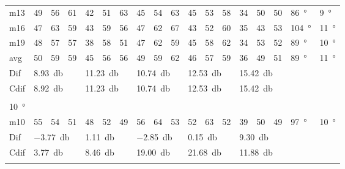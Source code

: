 \begin{table}[H]
\begin{tabular}{l|l|l|l|l|l|l|l|l|l|l|l|l|l|l|l|l|l}
m13  & 49     & 56     & 61    & 42     & 51     & 63    & 45     & 54     & 63    & 45     & 53     & 58    & 34 & 50 & 50   & \SI{86}{\degree} & \SI{9}{\degree}  \\
m16  & 47     & 63     & 59    & 43     & 59     & 56    & 47     & 62     & 67    & 43     & 52     & 60    & 35 & 43 & 53   & \SI{104}{\degree} & \SI{11}{\degree}  \\
m19  & 48     & 57     & 57    & 38     & 58     & 51    & 47     & 62     & 59    & 45     & 58     & 62    & 34 & 53 & 52   & \SI{89}{\degree} & \SI{10}{\degree}  \\ \hline
avg  &  50    &  59    & 59    &  45     &  56    &  56   & 49     & 59     & 62    & 46     & 57     & 59    & 36   & 49   & 51   & \SI{89}{\degree} & \SI{11}{\degree}  \\ \hline  
Dif & \multicolumn{3}{l|}{\SI{8.93}{\decibel}} & \multicolumn{3}{l|}{\SI{11.23}{\decibel}} & \multicolumn{3}{l|}{\SI{10.74}{\decibel}} & \multicolumn{3}{l|}{\SI{12.53}{\decibel}} & \multicolumn{3}{l|}{\SI{15.42}{\decibel}} & \multicolumn{2}{l}{}  \\ \hline 
Cdif & \multicolumn{3}{l|}{\SI{8.92}{\decibel}} & \multicolumn{3}{l|}{\SI{11.23}{\decibel}} & \multicolumn{3}{l|}{\SI{10.74}{\decibel}} & \multicolumn{3}{l|}{\SI{12.53}{\decibel}} & \multicolumn{3}{l|}{\SI{15.42}{\decibel}}  &   \multicolumn{2}{l}{}   \\ 
 \multicolumn{18}{l}{ } \\                             
\SI{10}{\degree}   & \multicolumn{3}{l|}{} & \multicolumn{3}{l|}{} & \multicolumn{3}{l|}{} & \multicolumn{3}{l|}{} &  \multicolumn{3}{l|}{}  & \multicolumn{2}{l}{}    \\  \hline
m10   &  55    &  54    &  51    & 48     &  52    &  49    & 56     &  64     &  53    &  52     &  63    &  52    & 39 & 50 & 49   & \SI{97}{\degree} & \SI{10}{\degree}  \\ \hline
Dif & \multicolumn{3}{l|}{\SI{-3.77}{\decibel}} & \multicolumn{3}{l|}{\SI{1.11}{\decibel}} & \multicolumn{3}{l|}{\SI{-2.85}{\decibel}} & \multicolumn{3}{l|}{\SI{0.15}{\decibel}} &  \multicolumn{3}{l|}{\SI{9.30}{\decibel}}  & \multicolumn{2}{l}{}   \\ \hline 
Cdif & \multicolumn{3}{l|}{\SI{3.77}{\decibel}} & \multicolumn{3}{l|}{\SI{8.46}{\decibel}} & \multicolumn{3}{l|}{\SI{19.00}{\decibel}} & \multicolumn{3}{l|}{\SI{21.68}{\decibel}} & \multicolumn{3}{l|}{\SI{11.88}{\decibel}}  &   \multicolumn{2}{l}{}   \\ 
 \multicolumn{18}{l}{ } \\                             

\end{tabular}
\end{table}

